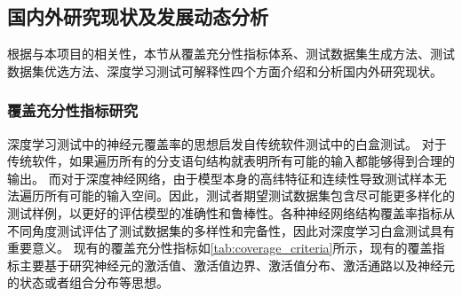 \subsection{国内外研究现状及发展动态分析}\label{relatedwork}


根据与本项目的相关性，本节从覆盖充分性指标体系、测试数据集生成方法、测试数据集优选方法、深度学习测试可解释性四个方面介绍和分析国内外研究现状。




\subsubsection{覆盖充分性指标研究}

深度学习测试中的神经元覆盖率的思想启发自传统软件测试中的白盒测试。
对于传统软件，如果遍历所有的分支语句结构就表明所有可能的输入都能够得到合理的输出。
而对于深度神经网络，由于模型本身的高纬特征和连续性导致测试样本无法遍历所有可能的输入空间。因此，测试者期望测试数据集包含尽可能更多样化的测试样例，以更好的评估模型的准确性和鲁棒性。各种神经网络结构覆盖率指标从不同角度测试评估了测试数据集的多样性和完备性，因此对深度学习白盒测试具有重要意义。 
现有的覆盖充分性指标如\cref{tab:coverage_criteria}所示，现有的覆盖指标主要基于研究神经元的激活值、激活值边界、激活值分布、激活通路以及神经元的状态或者组合分布等思想。


